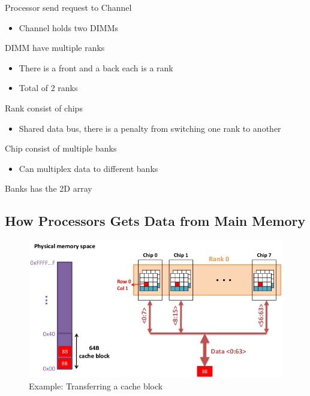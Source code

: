 \documentclass[]{article}
\providecommand{\tightlist}{%
  \setlength{\itemsep}{0pt}\setlength{\parskip}{0pt}}
\begin{document}
Processor send request to Channel

\begin{itemize}
\tightlist
\item
  Channel holds two DIMMs
\end{itemize}

DIMM have multiple ranks

\begin{itemize}
\tightlist
\item
  There is a front and a back each is a rank
\item
  Total of 2 ranks
\end{itemize}

Rank consist of chips

\begin{itemize}
\tightlist
\item
  Shared data bus, there is a penalty from switching one rank to another
\end{itemize}

Chip consist of multiple banks

\begin{itemize}
\tightlist
\item
  Can multiplex data to different banks
\end{itemize}

Banks has the 2D array

\newpage

\hypertarget{how-processors-gets-data-from-main-memory}{%
\subsection{How Processors Gets Data from Main
Memory}\label{how-processors-gets-data-from-main-memory}}

\begin{figure}
\centering
\includegraphics{./tex2pdf.-ee748c56ff17e1e1/cf36d48e85675d52cd1dcea1a7a7e327b41f1859.png}
\caption{Example: Transferring a cache block}
\end{figure}
\end{document}
